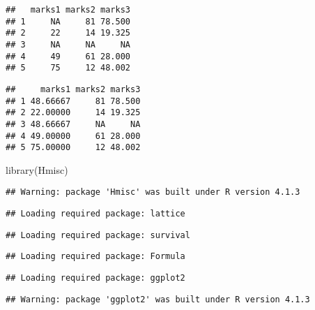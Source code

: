 \documentclass[
]{article}
\newenvironment{Shaded}{\begin{snugshade}}{\end{snugshade}}
\newcommand{\AttributeTok}[1]{\textcolor[rgb]{0.77,0.63,0.00}{#1}}
\newcommand{\CommentTok}[1]{\textcolor[rgb]{0.56,0.35,0.01}{\textit{#1}}}
\newcommand{\ConstantTok}[1]{\textcolor[rgb]{0.00,0.00,0.00}{#1}}
\newcommand{\FunctionTok}[1]{\textcolor[rgb]{0.00,0.00,0.00}{#1}}
\newcommand{\NormalTok}[1]{#1}
\newcommand{\OtherTok}[1]{\textcolor[rgb]{0.56,0.35,0.01}{#1}}
\newcommand{\SpecialCharTok}[1]{\textcolor[rgb]{0.00,0.00,0.00}{#1}}
\begin{document}
\begin{verbatim}
##   marks1 marks2 marks3
## 1     NA     81 78.500
## 2     22     14 19.325
## 3     NA     NA     NA
## 4     49     61 28.000
## 5     75     12 48.002
\end{verbatim}

\begin{Shaded}
\end{Shaded}

\begin{verbatim}
##     marks1 marks2 marks3
## 1 48.66667     81 78.500
## 2 22.00000     14 19.325
## 3 48.66667     NA     NA
## 4 49.00000     61 28.000
## 5 75.00000     12 48.002
\end{verbatim}

\begin{Shaded}
\begin{Highlighting}[]
\FunctionTok{library}\NormalTok{(Hmisc)}
\end{Highlighting}
\end{Shaded}

\begin{verbatim}
## Warning: package 'Hmisc' was built under R version 4.1.3
\end{verbatim}

\begin{verbatim}
## Loading required package: lattice
\end{verbatim}

\begin{verbatim}
## Loading required package: survival
\end{verbatim}

\begin{verbatim}
## Loading required package: Formula
\end{verbatim}

\begin{verbatim}
## Loading required package: ggplot2
\end{verbatim}

\begin{verbatim}
## Warning: package 'ggplot2' was built under R version 4.1.3
\end{verbatim}
\end{document}
